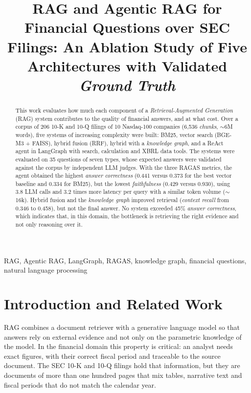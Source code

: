 \documentclass[conference]{IEEEtran}
\title{RAG and Agentic RAG for Financial Questions over SEC Filings: An Ablation Study of Five Architectures with Validated \textit{Ground Truth}}
\author{
\IEEEauthorblockN{Fernando José Soto Jácome}
\IEEEauthorblockA{Universidad San Francisco de Quito (USFQ) \\
fsotoj@estud.usfq.edu.ec}
}
\begin{document}
\maketitle

\begin{abstract}
This work evaluates how much each component of a \textit{Retrieval-Augmented Generation} (RAG) system contributes to the quality of financial answers, and at what cost. Over a corpus of 206 10-K and 10-Q filings of 10 Nasdaq-100 companies (6{,}536 \textit{chunks}, $\sim$6M words), five systems of increasing complexity were built: BM25, vector search (BGE-M3 + FAISS), hybrid fusion (RRF), hybrid with a \textit{knowledge graph}, and a ReAct agent in LangGraph with search, calculation and XBRL data tools. The systems were evaluated on 35 questions of seven types, whose expected answers were validated against the corpus by independent LLM judges. With the three RAGAS metrics, the agent obtained the highest \textit{answer correctness} (0.441 versus 0.373 for the best vector baseline and 0.334 for BM25), but the lowest \textit{faithfulness} (0.429 versus 0.930), using 3.8 LLM calls and 3.2 times more latency per query with a similar token volume ($\sim$16k). Hybrid fusion and the \textit{knowledge graph} improved retrieval (\textit{context recall} from 0.346 to 0.458), but not the final answer. No system exceeded 45\% \textit{answer correctness}, which indicates that, in this domain, the bottleneck is retrieving the right evidence and not only reasoning over it.
\end{abstract}

\begin{IEEEkeywords}
RAG, Agentic RAG, LangGraph, RAGAS, knowledge graph, financial questions, natural language processing
\end{IEEEkeywords}

\section{Introduction and Related Work}

RAG \cite{lewis2020rag} combines a document retriever with a generative language model so that answers rely on external evidence and not only on the parametric knowledge of the model. In the financial domain this property is critical: an analyst needs exact figures, with their correct fiscal period and traceable to the source document. The SEC 10-K and 10-Q filings hold that information, but they are documents of more than one hundred pages that mix tables, narrative text and fiscal periods that do not match the calendar year.
\end{document}
